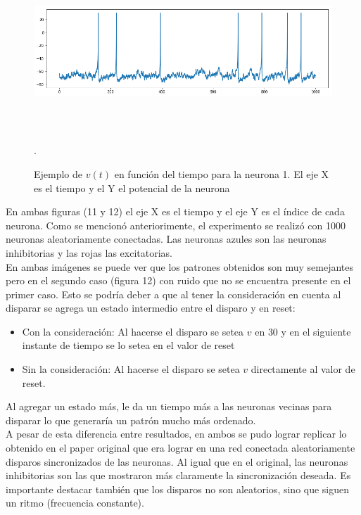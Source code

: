 \documentclass[12pt]{article}
\begin{document}
\begin{figure}[h!]
    \centering
        \includegraphics[height=6cm, width=15cm]{images/ejemploNeurona.png}
    \caption[fontsize=2pt]{Ejemplo de $v(t)$ en función del tiempo para la neurona 1. El eje X es el tiempo y el Y el potencial de la neurona}.
\end{figure}

\newpage

En ambas figuras (11 y 12) el eje X es el tiempo y el eje Y es el índice de cada neurona. Como se mencionó anteriorimente, el experimento se realizó con 1000 neuronas aleatoriamente conectadas.
Las neuronas azules son las neuronas inhibitorias y las rojas las excitatorias. \\

En ambas imágenes se puede ver que los patrones obtenidos son muy semejantes pero en el segundo caso (figura 12) con ruido que no se encuentra presente en el primer caso.
Esto se podría deber a que al tener la consideración en cuenta al disparar se agrega un estado intermedio entre el disparo y en reset:
\begin{itemize}
    \item Con la consideración: Al hacerse el disparo se setea $v$ en $30$ y en el siguiente instante de tiempo se lo setea en el valor de reset
    \item Sin la consideración: Al hacerse el disparo se setea $v$ directamente al valor de reset.
\end{itemize}

Al agregar un estado más, le da un tiempo más a las neuronas vecinas para disparar lo que generaría un patrón mucho más ordenado. \\

A pesar de esta diferencia entre resultados, en ambos se pudo lograr replicar lo obtenido en el paper original que era lograr en una red conectada aleatoriamente disparos sincronizados de las neuronas.
Al igual que en el original, las neuronas inhibitorias son las que mostraron más claramente la sincronización deseada. Es importante destacar también que los disparos no son aleatorios, sino que siguen un ritmo (frecuencia constante). \\
\end{document}
